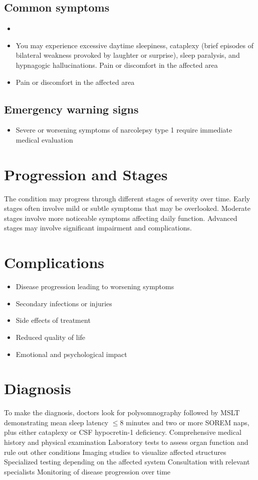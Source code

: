 \subsection{Common symptoms}
\begin{itemize}[noitemsep]
  \item \item You may experience excessive daytime sleepiness, cataplexy (brief episodes of bilateral weakness provoked by laughter or surprise), sleep paralysis, and hypnagogic hallucinations. Pain or discomfort in the affected area    \item Pain or discomfort in the affected area
  \end{itemize}

\subsection{Emergency warning signs}
\begin{itemize}[noitemsep]
  \item Severe or worsening symptoms of narcolepsy type 1 require immediate medical evaluation
\end{itemize}
\section{Progression and Stages}
The condition may progress through different stages of severity over time. Early stages often involve mild or subtle symptoms that may be overlooked. Moderate stages involve more noticeable symptoms affecting daily function. Advanced stages may involve significant impairment and complications.
\section{Complications}
\begin{itemize}[noitemsep]
  \item Disease progression leading to worsening symptoms
  \item Secondary infections or injuries
  \item Side effects of treatment
  \item Reduced quality of life
  \item Emotional and psychological impact
\end{itemize}
\section{Diagnosis}
To make the diagnosis, doctors look for polysomnography followed by MSLT demonstrating mean sleep latency $\le$8 minutes and two or more SOREM naps, plus either cataplexy or CSF hypocretin-1 deficiency. Comprehensive medical history and physical examination Laboratory tests to assess organ function and rule out other conditions Imaging studies to visualize affected structures Specialized testing depending on the affected system Consultation with relevant specialists Monitoring of disease progression over time

